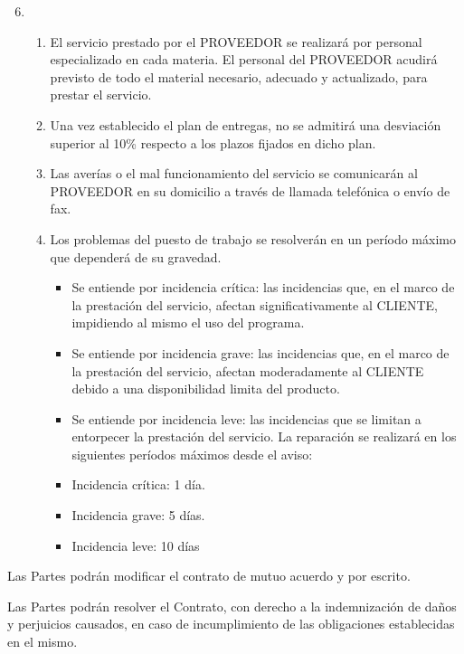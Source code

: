 \begin{description}[style=nextline]
\item[SEXTA.- ACUERDO DE NIVEL DE SERVICIO]

\begin{enumerate}
  \setcounter{enumi}{5}
  \item
  \begin{enumerate}
    \item	El servicio prestado por el PROVEEDOR se realizará por personal especializado en cada materia. El personal del PROVEEDOR acudirá previsto de todo el material necesario, adecuado y actualizado, para prestar el servicio.
    \item	Una vez establecido el plan de entregas, no se admitirá una desviación superior al 10\% respecto a los plazos fijados en dicho plan.
    \item	Las averías o el mal funcionamiento del servicio se comunicarán al PROVEEDOR en su domicilio a través de llamada telefónica o envío de fax.
    \item	Los problemas del puesto de trabajo se resolverán en un período máximo que dependerá de su gravedad.
    \begin{itemize}[-]
      \item	Se entiende por incidencia crítica: las incidencias que, en el marco de la prestación del servicio, afectan significativamente al CLIENTE, impidiendo al mismo el uso del programa.
      \item	Se entiende por incidencia grave: las incidencias que, en el marco de la prestación del servicio, afectan moderadamente al CLIENTE debido a una disponibilidad limita del producto.
      \item	Se entiende por incidencia leve: las incidencias que se limitan a entorpecer la prestación del servicio.
      La reparación se realizará en los siguientes períodos máximos  desde el aviso:
      \item	Incidencia crítica: 1 día.
      \item	Incidencia grave: 5 días.
      \item	Incidencia leve: 10 días
    \end{itemize}
  \end{enumerate}
\end{enumerate}

\item[SÉPTIMA.- MODIFICACIÓN]
\par Las Partes podrán modificar el contrato de mutuo acuerdo y por escrito.

\item[OCTAVA.- RESOLUCIÓN]
\par Las Partes podrán resolver el Contrato, con derecho a la indemnización de daños y perjuicios causados, en caso de incumplimiento de las obligaciones establecidas en el mismo.


\end{description}
